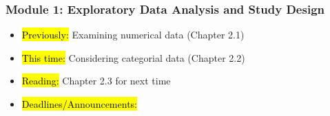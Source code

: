 
\begin{frame}
    \frametitle{Module 1: Exploratory Data Analysis and Study Design}
    \begin{itemize}
        \item \hl{Previously: } Examining numerical data (Chapter 2.1)
        \item \hl{This time: } Considering categorial data (Chapter 2.2)
        \item \hl{Reading: } Chapter 2.3 for next time
        \item \hl{Deadlines/Announcements: } 
    \end{itemize}
    
    \end{frame}
    